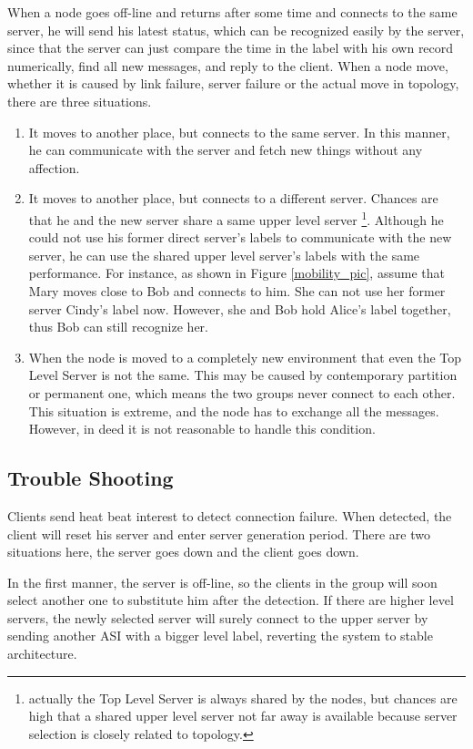 \documentclass[conference]{IEEEtran}
\begin{document}
When a node goes off-line and returns after some time and connects to the same server,
he will send his latest status, which can be recognized easily by the server,
since that the server can just compare the time in the label with his own record numerically,
find all new messages, and reply to the client.
When a node move, whether it is caused by link failure,
server failure or the actual move in topology, there are three situations.
\begin{enumerate}{}
	\item It moves to another place, but connects to the same server.
In this manner, he can communicate with the server and fetch new things without any affection.
	\item It moves to another place, but connects to a different server.
Chances are that he and the new server share a same upper level server
\footnote{actually the Top Level Server is always shared by the nodes,
but chances are high that a shared upper level server not far away is available
because server selection is closely related to topology.}.
Although he could not use his former direct server's labels to communicate with the new server,
he can use the shared upper level server's labels with the same performance.
For instance, as shown in Figure \ref{mobility_pic},
assume that Mary moves close to Bob and connects to him.
She can not use her former server Cindy's label now.
However, she and Bob hold Alice's label together, thus Bob can still recognize her.
	\item When the node is moved to a completely new environment that even the Top Level Server is not the same.
This may be caused by contemporary partition or permanent one,
which means the two groups never connect to each other. This situation is extreme,
and the node has to exchange all the messages.
However, in deed it is not reasonable to handle this condition.
\end{enumerate}

\subsection{Trouble Shooting}
\label{trouble_shooting}
Clients send heat beat interest to detect connection failure.
When detected, the client will reset his server and enter server generation period.
There are two situations here, the server goes down and the client goes down.

In the first manner, the server is off-line,
so the clients in the group will soon select another one to substitute him after the detection.
If there are higher level servers,
the newly selected server will surely connect to the upper server by sending another
ASI with a bigger level label, reverting the system to stable architecture.
\end{document}
